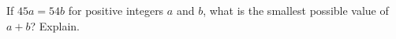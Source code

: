 If $45a=54b$ for positive integers $a$ and $b$, what is the smallest possible value of $a+b$? Explain.
